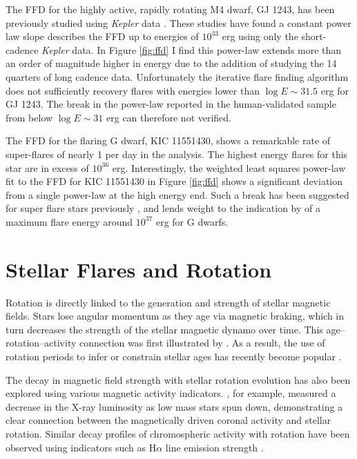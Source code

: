 \documentclass[twocolumn]{aastex6}
\newcommand{\Kepler}{\textsl{Kepler}\xspace}
\begin{document}
The FFD for the highly active, rapidly rotating M4 dwarf, GJ 1243, has been previously studied using \Kepler data \citep{ramsay2013,hawley2014,davenport2014b,silverberg2016}. These studies have found a constant power law slope describes the FFD up to energies of $10^{33}$ erg using only the short-cadence \Kepler data. In Figure \ref{fig:ffd} I find this power-law extends more than an order of magnitude higher in energy due to the addition of studying the 14 quarters of long cadence data. Unfortunately the iterative flare finding algorithm does not sufficiently recovery flares with energies lower than $\log E \sim 31.5$ erg for GJ 1243. The break in the power-law reported in the human-validated sample from \citet{hawley2014} below $\log E \sim 31$ erg can therefore not verified.


The FFD for the flaring G dwarf, KIC 11551430, shows a remarkable rate of super-flares of nearly 1 per day in the analysis. The highest energy flares for this star are in excess of $10^{36}$ erg. Interestingly, the weighted least squares power-law fit to the FFD for KIC 11551430 in Figure \ref{fig:ffd} shows a significant deviation from a single power-law at the high energy end. Such a break has been suggested for super flare stars previously \citep{chang2015, hudson2015}, and lends weight to the indication by \citet{wu2015} of a maximum flare energy around $10^{37}$ erg for G dwarfs.




\section{Stellar Flares and Rotation}
\label{sec:rot}

Rotation is directly linked to the generation and strength of stellar magnetic fields. Stars lose angular momentum as they age via magnetic braking, which in turn decreases the strength of the stellar magnetic dynamo over time. This age--rotation--activity connection was first illustrated by \citet{skumanich1972}. As a result, the use of rotation periods to infer or constrain stellar ages has recently become popular \citep[e.g.][]{barnes2007,mamajek2008,van-saders2016}.

The decay in magnetic field strength with stellar rotation evolution has also been explored using various magnetic activity indicators. \citet{wright2011}, for example, measured a decrease in the X-ray luminosity as low mass stars spun down, demonstrating a clear connection between the magnetically driven coronal activity and stellar rotation. Similar decay profiles of chromospheric activity with rotation have been observed using indicators such as H$\alpha$ line emission strength \citep{douglas2014}. 
\end{document}
